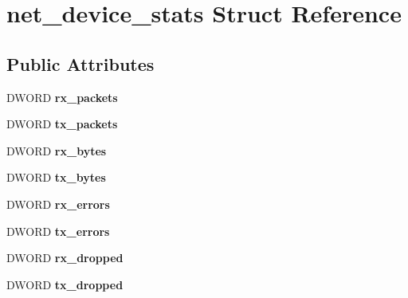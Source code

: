 \hypertarget{structnet__device__stats}{
\section{net\_\-device\_\-stats Struct Reference}
\label{structnet__device__stats}
}
\subsection*{Public Attributes}
\begin{DoxyCompactItemize}
\item 
\hypertarget{structnet__device__stats_a3ea45c10de9ab9c5cf2a7cf9dc67f250}{
DWORD {\bfseries rx\_\-packets}}
\label{structnet__device__stats_a3ea45c10de9ab9c5cf2a7cf9dc67f250}

\item 
\hypertarget{structnet__device__stats_ac9c8aa61d5807e0bfdd8c4561c73a7a1}{
DWORD {\bfseries tx\_\-packets}}
\label{structnet__device__stats_ac9c8aa61d5807e0bfdd8c4561c73a7a1}

\item 
\hypertarget{structnet__device__stats_ac71001b50e2eba6ef51705a1e8d1e3ce}{
DWORD {\bfseries rx\_\-bytes}}
\label{structnet__device__stats_ac71001b50e2eba6ef51705a1e8d1e3ce}

\item 
\hypertarget{structnet__device__stats_a849d7b35ce1ce078be676440f6c3523d}{
DWORD {\bfseries tx\_\-bytes}}
\label{structnet__device__stats_a849d7b35ce1ce078be676440f6c3523d}

\item 
\hypertarget{structnet__device__stats_ade760f29dd1fccd2053bcfe3a7c7659e}{
DWORD {\bfseries rx\_\-errors}}
\label{structnet__device__stats_ade760f29dd1fccd2053bcfe3a7c7659e}

\item 
\hypertarget{structnet__device__stats_afceb0ab2421631a6648c93e6c5932d3a}{
DWORD {\bfseries tx\_\-errors}}
\label{structnet__device__stats_afceb0ab2421631a6648c93e6c5932d3a}

\item 
\hypertarget{structnet__device__stats_ae6a3c65c9ebb86b61e51778892a7d473}{
DWORD {\bfseries rx\_\-dropped}}
\label{structnet__device__stats_ae6a3c65c9ebb86b61e51778892a7d473}

\item 
\hypertarget{structnet__device__stats_a65caa3b38dd0184dd4ccb6bd3a7015d6}{
DWORD {\bfseries tx\_\-dropped}}
\label{structnet__device__stats_a65caa3b38dd0184dd4ccb6bd3a7015d6}


\end{DoxyCompactItemize}
